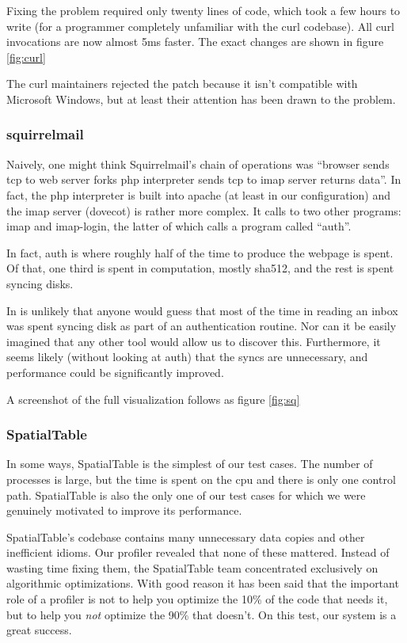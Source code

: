 \documentclass[10pt]{article}
\begin{document}
Fixing the problem required only twenty lines of code, which took a few hours to write (for a programmer completely unfamiliar with the curl codebase).  All curl invocations are now almost 5ms faster.  The exact changes are shown in figure \ref{fig:curl}

The curl maintainers rejected the patch because it isn't compatible with Microsoft Windows, but at least their attention has been drawn to the problem.

\subsubsection{squirrelmail}

Naively, one might think Squirrelmail's chain of operations was ``browser sends tcp to web server forks php interpreter sends tcp to imap server returns data''.  In fact, the php interpreter is built into apache (at least in our configuration) and the imap server (dovecot) is rather more complex.  It calls to two other programs: imap and imap-login, the latter of which calls a program called ``auth''.

In fact, auth is where roughly half of the time to produce the webpage is spent.  Of that, one third is spent in computation, mostly sha512, and the rest is spent syncing disks.

In is unlikely that anyone would guess that most of the time in reading an inbox was spent syncing disk as part of an authentication routine.  Nor can it be easily imagined that any other tool would allow us to discover this.  Furthermore, it seems likely (without looking at auth) that the syncs are unnecessary, and performance could be significantly improved.

A screenshot of the full visualization follows as figure \ref{fig:sq}

\subsubsection{SpatialTable}

In some ways, SpatialTable is the simplest of our test cases.  The number of processes is large, but the time is spent on the cpu and there is only one control path.  SpatialTable is also the only one of our test cases for which we were genuinely motivated to improve its performance.

SpatialTable's codebase contains many unnecessary data copies and other inefficient idioms.  Our profiler revealed that none of these mattered.  Instead of wasting time fixing them, the SpatialTable team concentrated exclusively on algorithmic optimizations.  With good reason it has been said that the important role of a profiler is not to help you optimize the 10\% of the code that needs it, but to help you \emph{not} optimize the 90\% that doesn't\cite{taoup}.  On this test, our system is a great success.
\end{document}
